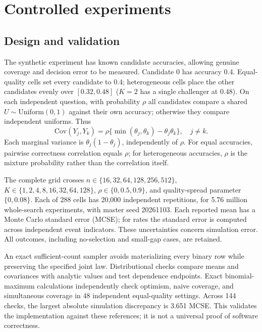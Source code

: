 \section{Controlled experiments}
\label{sec:synthetic}
\subsection{Design and validation}
The synthetic experiment has known candidate accuracies, allowing genuine coverage and decision error to be measured. Candidate 0 has accuracy 0.4. Equal-quality cells set every candidate to 0.4; heterogeneous cells place the other candidates evenly over $[0.32,0.48]$ ($K=2$ has a single challenger at 0.48). On each independent question, with probability $\rho$ all candidates compare a shared $U\sim\mathrm{Uniform}(0,1)$ against their own accuracy; otherwise they compare independent uniforms. Thus
\begin{equation}
 \mathrm{Cov}(Y_j,Y_k)=\rho\{\min(\theta_j,\theta_k)-\theta_j\theta_k\},\quad j\ne k.
\end{equation}
Each marginal variance is $\theta_j(1-\theta_j)$, independently of $\rho$. For equal accuracies, pairwise correctness correlation equals $\rho$; for heterogeneous accuracies, $\rho$ is the mixture probability rather than the correlation itself.

The complete grid crosses $n\in\{16,32,64,128,256,512\}$, $K\in\{1,2,4,8,16,32,64,128\}$, $\rho\in\{0,0.5,0.9\}$, and quality-spread parameter $\{0,0.08\}$. Each of 288 cells has 20,000 independent repetitions, for 5.76 million whole-search experiments, with master seed 20261103. Each reported mean has a Monte Carlo standard error (MCSE); for rates the standard error is computed across independent event indicators. These uncertainties concern simulation error. All outcomes, including no-selection and small-gap cases, are retained.

An exact sufficient-count sampler avoids materializing every binary row while preserving the specified joint law. Distributional checks compare means and covariances with analytic values and test dependence endpoints. Exact binomial-maximum calculations independently check optimism, naive coverage, and simultaneous coverage in 48 independent equal-quality settings. Across 144 checks, the largest absolute simulation discrepancy is 3.651 MCSE. This validates the implementation against these references; it is not a universal proof of software correctness.

